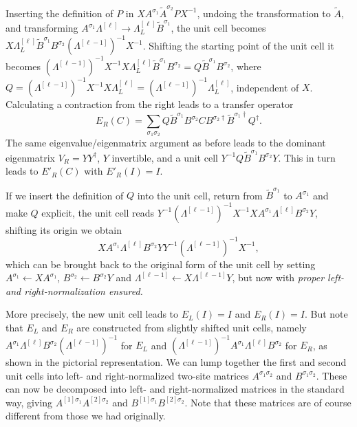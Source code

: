 Inserting the definition of $P$ in $X A^{\sigma_1}\tilde{A}^{\sigma_2}P X^{-1}$, undoing the transformation to $\tilde{A}$, and transforming $A^{\sigma_1} \Lambda^{[\ell]} \rightarrow \Lambda^{[\ell]}_L \tilde{B}^{\sigma_1}$, the unit cell becomes $X \Lambda^{[\ell]}_L \tilde{B}^{\sigma_1} B^{\sigma_2} (\Lambda^{[\ell-1]})^{-1} X^{-1}$. Shifting the starting point of the unit cell it becomes $(\Lambda^{[\ell-1]})^{-1} X^{-1} X \Lambda^{[\ell]}_L \tilde{B}^{\sigma_1} B^{\sigma_2} = Q \tilde{B}^{\sigma_1} B^{\sigma_2}$, where $Q = (\Lambda^{[\ell-1]})^{-1} X^{-1} X \Lambda_L^{[\ell]} = (\Lambda^{[\ell-1]})^{-1} \Lambda_L^{[\ell]}$, independent of $X$. Calculating a contraction from the right leads to a transfer operator
\begin{equation}
E_R(C) = \sum_{\sigma_1\sigma_2} Q \tilde{B}^{\sigma_1} B^{\sigma_2} C B^{\sigma_2\dagger} \tilde{B}^{\sigma_1\dagger} Q^\dagger .
\end{equation}
The same eigenvalue/eigenmatrix argument as before leads to the dominant eigenmatrix $V_R = YY^\dagger$, $Y$ invertible, and a unit cell $Y^{-1}Q \tilde{B}^{\sigma_1} B^{\sigma_2} Y$.
This in turn leads to $E'_R(C)$ with $E'_R(I)=I$. 

If we insert the definition of $Q$ into the unit cell, return from $\tilde{B}^{\sigma_1}$ to $A^{\sigma_1}$ and make $Q$ explicit, the unit cell reads 
$Y^{-1}  (\Lambda^{[\ell-1]})^{-1} X^{-1} X A^{\sigma_1} \Lambda^{[\ell]} B^{\sigma_2} Y$, shifting its origin we obtain
\begin{equation}
X A^{\sigma_1} \Lambda^{[\ell]} B^{\sigma_2} Y Y^{-1}  (\Lambda^{[\ell-1]})^{-1} X^{-1} ,
\end{equation}
which can be brought back to the original form of the unit cell by setting 
$A^{\sigma_1} \leftarrow XA^{\sigma_1}$, $B^{\sigma_2} \leftarrow B^{\sigma_2}Y$ and $\Lambda^{[\ell-1]} \leftarrow X\Lambda^{[\ell-1]}Y$, but now with {\em proper left- and right-normalization ensured.} 

More precisely, the new unit cell leads to $E_L(I)=I$ and $E_R(I)=I$. But note that $E_L$ and $E_R$ are constructed from slightly shifted unit cells, namely $A^{\sigma_1} \Lambda^{[\ell]} B^{\sigma_2} (\Lambda^{[\ell-1]})^{-1}$ for $E_L$ and $(\Lambda^{[\ell-1]})^{-1} A^{\sigma_1} \Lambda^{[\ell]} B^{\sigma_2}$ for $E_R$, as shown in the pictorial representation. We can lump together the first and second unit cells into left- and right-normalized two-site matrices $A^{\sigma_1\sigma_2}$ and $B^{\sigma_1\sigma_2}$. These can now be decomposed into left- and right-normalized matrices in the standard way, giving $A^{[1]\sigma_1}A^{[2]\sigma_2}$ and $B^{[1]\sigma_1}B^{[2]\sigma_2}$. Note that these matrices are of course different from those we had originally.

